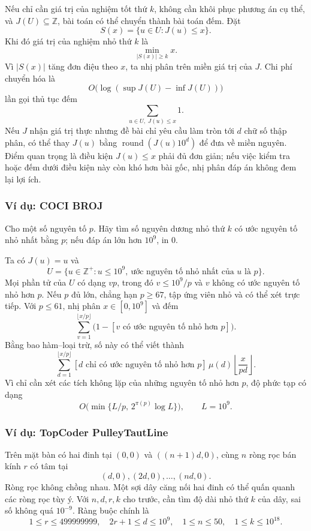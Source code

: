 \documentclass[11pt]{article}
\begin{document}
Nếu chỉ cần giá trị của nghiệm tốt thứ \(k\), không cần khôi phục phương án cụ
thể, và \(J(U)\subseteq\mathbb{Z}\), bài toán có thể chuyển thành bài toán đếm.
Đặt
\[
  S(x)=\{u\in U:J(u)\le x\}.
\]
Khi đó giá trị của nghiệm nhỏ thứ \(k\) là
\[
  \min_{|S(x)|\ge k} x.
\]
Vì \(|S(x)|\) tăng đơn điệu theo \(x\), ta nhị phân trên miền giá trị của
\(J\). Chi phí chuyển hóa là
\[
  O\bigl(\log(\sup J(U)-\inf J(U))\bigr)
\]
lần gọi thủ tục đếm
\[
  \sum_{u\in U,\;J(u)\le x} 1.
\]
Nếu \(J\) nhận giá trị thực nhưng đề bài chỉ yêu cầu làm tròn tới \(d\) chữ số
thập phân, có thể thay \(J(u)\) bằng \(\operatorname{round}(J(u)10^d)\) để đưa
về miền nguyên. Điểm quan trọng là điều kiện \(J(u)\le x\) phải đủ đơn giản; nếu
việc kiểm tra hoặc đếm dưới điều kiện này còn khó hơn bài gốc, nhị phân đáp án
không đem lại lợi ích.

\subsubsection{Ví dụ: COCI BROJ}

Cho một số nguyên tố \(p\). Hãy tìm số nguyên dương nhỏ thứ \(k\) có ước nguyên
tố nhỏ nhất bằng \(p\); nếu đáp án lớn hơn \(10^9\), in \(0\).

Ta có \(J(u)=u\) và
\[
  U=\{u\in\mathbb{Z}^+:u\le 10^9,\ \text{ước nguyên tố nhỏ nhất của }u
  \text{ là }p\}.
\]
Mọi phần tử của \(U\) có dạng \(vp\), trong đó \(v\le 10^9/p\) và \(v\) không
có ước nguyên tố nhỏ hơn \(p\). Nếu \(p\) đủ lớn, chẳng hạn \(p\ge 67\), tập ứng
viên nhỏ và có thể xét trực tiếp. Với \(p\le 61\), nhị phân \(x\in[0,10^9]\) và
đếm
\[
  \sum_{v=1}^{\lfloor x/p\rfloor}
    \bigl(1-[v\text{ có ước nguyên tố nhỏ hơn }p]\bigr).
\]
Bằng bao hàm--loại trừ, số này có thể viết thành
\[
  \sum_{d=1}^{\lfloor x/p\rfloor}
    [d\text{ chỉ có ước nguyên tố nhỏ hơn }p]\,
    \mu(d)\left\lfloor\frac{x}{pd}\right\rfloor.
\]
Vì chỉ cần xét các tích không lặp của những nguyên tố nhỏ hơn \(p\), độ phức tạp
có dạng
\[
  O\bigl(\min\{L/p,\,2^{\pi(p)}\log L\}\bigr),
  \qquad L=10^9.
\]

\subsubsection{Ví dụ: TopCoder PulleyTautLine}

Trên mặt bàn có hai đinh tại \((0,0)\) và \(((n+1)d,0)\), cùng \(n\) ròng rọc
bán kính \(r\) có tâm tại
\[
  (d,0),(2d,0),\ldots,(nd,0).
\]
Ròng rọc không chồng nhau. Một sợi dây căng nối hai đinh có thể quấn quanh các
ròng rọc tùy ý. Với \(n,d,r,k\) cho trước, cần tìm độ dài nhỏ thứ \(k\) của dây,
sai số không quá \(10^{-9}\). Ràng buộc chính là
\[
  1\le r\le 499999999,\quad
  2r+1\le d\le 10^9,\quad
  1\le n\le 50,\quad
  1\le k\le 10^{18}.
\]
\end{document}
